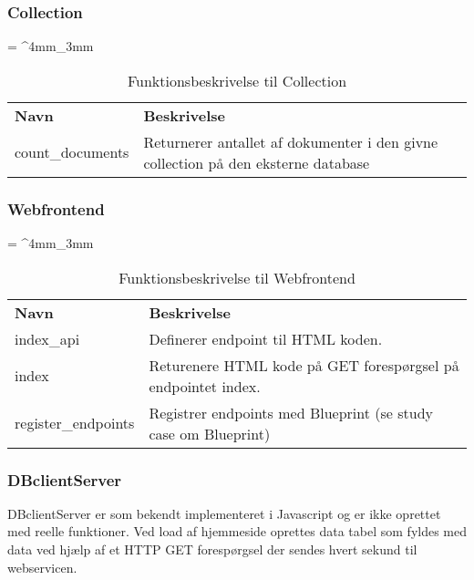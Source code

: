 \begin{appendices}
\subsubsection{Collection}
\begin{table}[H]
	\renewcommand{\arraystretch}{2}
	\centering
	\sffamily
	\tabulinesep = ^4mm_3mm
	\begin{tabu}{ m{4cm}  m{8.5cm} }
		\color{white}\bfseries Navn &\color{white}\bfseries Beskrivelse \\
		count\_documents & Returnerer antallet af dokumenter i den givne collection på den eksterne database \\
	\end{tabu}
	\caption{Funktionsbeskrivelse til Collection}
	\label{tab:func_descr_collection}
\end{table}

\subsubsection{Webfrontend}
\begin{table}[H]
	\renewcommand{\arraystretch}{2}
	\centering
	\sffamily
	\tabulinesep = ^4mm_3mm
	\begin{tabu}{ m{4cm}  m{8.5cm} }
		\color{white}\bfseries Navn &\color{white}\bfseries Beskrivelse \\
		index\_api & Definerer endpoint til HTML koden. \\
		index & Returenere HTML kode på GET forespørgsel på endpointet index. \\ 
		register\_endpoints & Registrer endpoints med Blueprint (se study case om Blueprint) \\
	\end{tabu}
	\caption{Funktionsbeskrivelse til Webfrontend}
	\label{tab:func_descr_webfrontend}
\end{table}

\subsubsection{DBclientServer}
DBclientServer er som bekendt implementeret i Javascript og er ikke oprettet med reelle funktioner. Ved load af hjemmeside oprettes data tabel som fyldes med data ved hjælp af et HTTP GET forespørgsel der sendes hvert sekund til webservicen.
\pagebreak 



\end{appendices}
